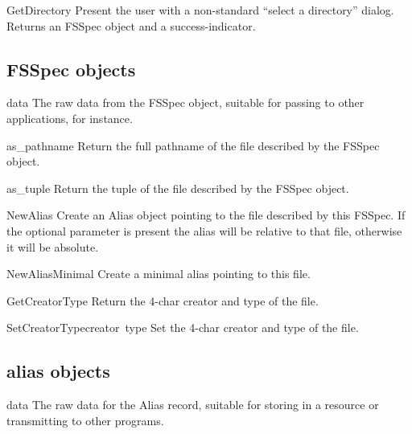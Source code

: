 \begin{funcdesc}{GetDirectory}{}
Present the user with a non-standard ``select a directory''
dialog. Returns an FSSpec object and a success-indicator.
\end{funcdesc}

\subsection{FSSpec objects}

\renewcommand{\indexsubitem}{(FSSpec object method)}
\begin{datadesc}{data}
The raw data from the FSSpec object, suitable for passing
to other applications, for instance.
\end{datadesc}

\begin{funcdesc}{as_pathname}{}
Return the full pathname of the file described by the FSSpec object.
\end{funcdesc}

\begin{funcdesc}{as_tuple}{}
Return the  tuple of the file described
by the FSSpec object.
\end{funcdesc}

\begin{funcdesc}{NewAlias}{}
Create an Alias object pointing to the file described by this
FSSpec. If the optional  parameter is present the alias
will be relative to that file, otherwise it will be absolute.
\end{funcdesc}

\begin{funcdesc}{NewAliasMinimal}{}
Create a minimal alias pointing to this file.
\end{funcdesc}

\begin{funcdesc}{GetCreatorType}{}
Return the 4-char creator and type of the file.
\end{funcdesc}

\begin{funcdesc}{SetCreatorType}{creator\, type}
Set the 4-char creator and type of the file.
\end{funcdesc}

\subsection{alias objects}

\renewcommand{\indexsubitem}{(alias object method)}
\begin{datadesc}{data}
The raw data for the Alias record, suitable for storing in a resource
or transmitting to other programs.
\end{datadesc}

